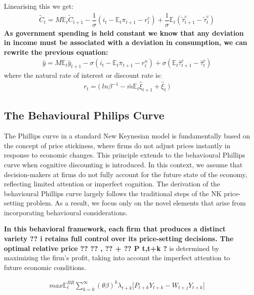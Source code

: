 \documentclass[11pt]{article}
\begin{document}
\begin{spacing}{2}
Linearising this we get:
\begin{align}
	\tilde{C}_t = M\mathbb{E}_t \tilde{C}_{t+1}  - \dfrac{1}{\sigma}(i_t - \mathbb{E}_t \pi_{t+1} -r^{e}_t) + \dfrac{1}{\sigma}\mathbb{E}_t(\tilde{\tau}_{t+1}^c - \tilde{\tau}_{t}^c)
\end{align}
\textbf{As government spending is held constant we know that any deviation in income must be associated with a deviation in consumption, we can rewrite the previous equation:
}
\begin{align}
	\hat{y} = M\mathbb{E}_t \hat{y}_{t+1}  - \sigma(i_t - \mathbb{E}_t \pi_{t+1} - r_t^n) + \sigma(\mathbb{E}_t \hat{\tau}_{t+1}^c - \hat{\tau}_{t}^c )
\end{align}
where the natural rate of interest or discount rate is:
\begin{align}
	r_t = \big( \: ln\beta^{-1} - \bar{m} \mathbb{E}_t \hat{\xi}_{t+1} + \hat{\xi}_t \: \big) 
\end{align}


\subsection{The Behavioural Philips Curve}
The Phillips curve in a standard New Keynesian  model is fundamentally based on the concept of price stickiness, where firms do not adjust prices instantly in response to economic changes. This principle extends to the behavioural Phillips curve when cognitive discounting is introduced. In this context, we assume that decision-makers at firms do not fully account for the future state of the economy, reflecting limited attention or imperfect cognition. The derivation of the behavioural Phillips curve largely follows the traditional steps of the NK price-setting problem. As a result, we focus  only on the novel elements that arise from incorporating behavioural considerations.

\textbf{In this behavioral framework, each firm that produces a distinct variety 
??
i retains full control over its price-setting decisions. The optimal relative price 
??
??
,
??
+
??
P 
t,t+k
?}
is determined by maximizing the firm's profit, taking into account the imperfect attention to future economic conditions.


\begin{align}
	max\mathbb{E}_t^{BR} \sum_{k=0}^{\infty} (\theta \beta)^k \lambda_{t+k} \big[P_{t+k}Y_{t+k} - W_{t+j}Y_{t+k} \big] 
\end{align}




\end{spacing}
\end{document}
